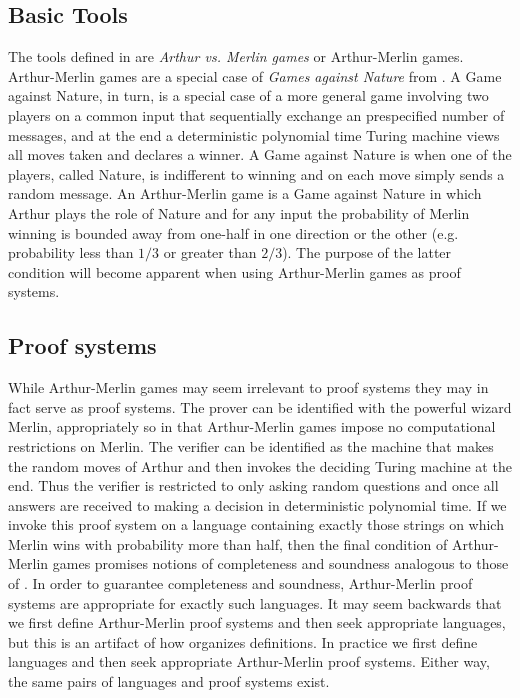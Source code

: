 \subsection{Basic Tools}

The tools defined in \cite{Bab85} are \emph{Arthur vs. Merlin games} or Arthur-Merlin games.
Arthur-Merlin games are a special case of \emph{Games against Nature} from \cite{Pap84}.
A Game against Nature, in turn, is a special case of a more general game involving two players on a common input that sequentially exchange an prespecified number of messages, and at the end a deterministic polynomial time Turing machine views all moves taken and declares a winner.
A Game against Nature is when one of the players, called Nature, is indifferent to winning and on each move simply sends a random message.
An Arthur-Merlin game is a Game against Nature in which Arthur plays the role of Nature and for any input the probability of Merlin winning is bounded away from one-half in one direction or the other (e.g. probability less than $1/3$ or greater than $2/3$).
The purpose of the latter condition will become apparent when using Arthur-Merlin games as proof systems.

\subsection{Proof systems}

While Arthur-Merlin games may seem irrelevant to proof systems they may in fact serve as proof systems.
The prover can be identified with the powerful wizard Merlin, appropriately so in that Arthur-Merlin games impose no computational restrictions on Merlin.
The verifier can be identified as the machine that makes the random moves of Arthur and then invokes the deciding Turing machine at the end.
Thus the verifier is restricted to only asking random questions and once all answers are received to making a decision in deterministic polynomial time.
If we invoke this proof system on a language containing exactly those strings on which Merlin wins with probability more than half, then the final condition of Arthur-Merlin games promises notions of completeness and soundness analogous to those of \cite{GMR85}.
In order to guarantee completeness and soundness, Arthur-Merlin proof systems are appropriate for exactly such languages.
It may seem backwards that we first define Arthur-Merlin proof systems and then seek appropriate languages, but this is an artifact of how \cite{Bab85} organizes definitions.
In practice we first define languages and then seek appropriate Arthur-Merlin proof systems.
Either way, the same pairs of languages and proof systems exist.

